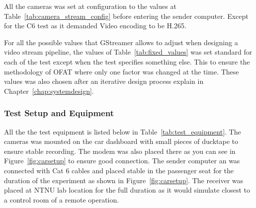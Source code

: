 All the cameras was set at configuration to the values at Table~\ref{tab:camera_stream_config} before entering the sender computer. Except for the C6 test as it demanded Video encoding to be H.265.



For all the possible values that GStreamer allows to adjust when designing a video stream pipeline, the values of Table~\ref{tab:fixed_values} was set standard for each of the test except when the test specifies something else. This to ensure the methodology of OFAT where only one factor was changed at the time. These values was also chosen after an iterative design process explain in Chapter~\ref{chap:systemdesign}.




\subsubsection{Test Setup and Equipment}

All the the test equipment is listed below in Table~\ref{tab:test_equipment}. The cameras was mounted on the car dashboard with small pieces of ducktape to ensure stable recording. The modem was also placed there as you can see in Figure~\ref{fig:carsetup} to ensure good connection. The sender computer an was connected with Cat 6 cables and placed stable in the passenger seat for the duration of the experiment as shown in Figure~\ref{fig:carsetup}. The receiver was placed at NTNU lab location for the full duration as it would simulate closest to a control room of a remote operation.



